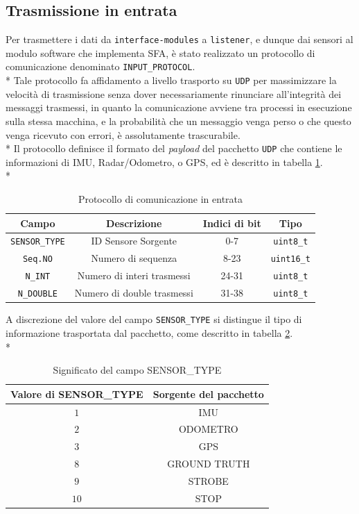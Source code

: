 \subsection{Trasmissione in entrata}
Per trasmettere i dati da \texttt{interface-modules} a \texttt{listener}, e dunque dai sensori al modulo software che implementa SFA, \`e stato realizzato un protocollo di comunicazione denominato \texttt{INPUT\_PROTOCOL}.\\*
Tale protocollo fa affidamento a livello trasporto su \texttt{UDP} per massimizzare la velocit\`a di trasmissione senza dover necessariamente rinunciare all'integrit\`a dei messaggi trasmessi, in quanto la comunicazione avviene tra processi in esecuzione sulla stessa macchina, e la probabilit\`a che un messaggio venga perso o che questo venga ricevuto con errori, \`e assolutamente trascurabile.\\*
Il protocollo definisce il formato del \emph{payload} del pacchetto \texttt{UDP} che contiene le informazioni di IMU, Radar/Odometro, o GPS, ed \`e descritto in tabella \ref{tab:protoin}.\\*
\begin{table}[h]
			\centering
\begin{tabular}{|c|c|c|c|}
	\hline 
	\textbf{Campo} & \textbf{Descrizione} & \textbf{Indici di bit} & \textbf{Tipo} \\ 
	\hline 
	\texttt{SENSOR\_TYPE} & ID Sensore Sorgente & 0-7 & \texttt{uint8\_t} \\ 
	\hline 
	\texttt{Seq.NO} & Numero di sequenza & 8-23 & \texttt{uint16\_t} \\ 
	\hline 
	\texttt{N\_INT} & Numero di interi trasmessi & 24-31 & \texttt{uint8\_t} \\ 
	\hline 
	\texttt{N\_DOUBLE} & Numero di double trasmessi & 31-38 & \texttt{uint8\_t} \\ 
	\hline 
\end{tabular} 
\caption{Protocollo di comunicazione in entrata}
\label{tab:protoin}
\end{table}\newpage
A discrezione del valore del campo \texttt{SENSOR\_TYPE} si distingue il tipo di informazione trasportata dal pacchetto, come descritto in tabella \ref{tab:sensors}.\\*
\begin{table}[h]
		\centering
	\begin{tabular}{|c|c|}
		\hline 
		\textbf{Valore di SENSOR\_TYPE} & \textbf{Sorgente del pacchetto} \\ 
		\hline 
		$1$ & IMU \\ 
		\hline 
		$2$ & ODOMETRO \\ 
		\hline 
		$3$ & GPS \\ 
		\hline 
		$8$ & GROUND TRUTH \\ 
		\hline 
		$9$ & STROBE \\ 
		\hline 
		$10$ & STOP \\ 
		\hline 
	\end{tabular} 
	\caption{Significato del campo SENSOR\_TYPE}
	\label{tab:sensors}
\end{table}
